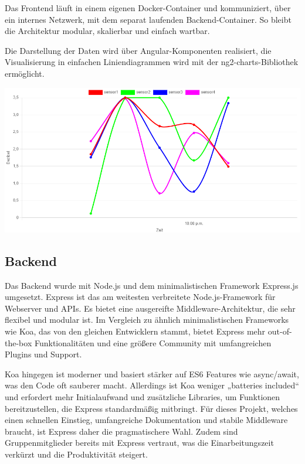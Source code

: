 Das Frontend läuft in einem eigenen Docker-Container und kommuniziert, 
über ein internes Netzwerk, mit dem separat laufenden Backend-Container. 
So bleibt die Architektur modular, skalierbar und einfach wartbar.

Die Darstellung der Daten wird über Angular-Komponenten realisiert,
die Visualisierung in einfachen Liniendiagrammen wird mit der ng2-charts-Bibliothek ermöglicht.
\begin{center}
  \includegraphics[width=1\textwidth]{../images/LinechartFE.png}
\end{center}

\subsection{Backend}
Das Backend wurde mit Node.js und dem minimalistischen Framework Express.js umgesetzt. 
Express ist das am weitesten verbreitete Node.js-Framework für Webserver und APIs. 
Es bietet eine ausgereifte Middleware-Architektur, die sehr flexibel und modular ist. 
Im Vergleich zu ähnlich minimalistischen Frameworks wie Koa, 
das von den gleichen Entwicklern stammt, 
bietet Express mehr out-of-the-box Funktionalitäten und eine größere Community mit umfangreichen Plugins und Support. \cite{betterstack2025koavsexpress,appventurez2025nodejsframework}

Koa hingegen ist moderner und basiert stärker auf ES6 Features wie async/await, was den Code oft sauberer macht. 
Allerdings ist Koa weniger „batteries included“ und erfordert mehr Initialaufwand und zusätzliche Libraries, 
um Funktionen bereitzustellen, die Express standardmäßig mitbringt. 
Für dieses Projekt, welches einen schnellen Einstieg, umfangreiche Dokumentation und stabile Middleware braucht, 
ist Express daher die pragmatischere Wahl.
Zudem sind Gruppenmitglieder bereits mit Express vertraut, was die Einarbeitungszeit verkürzt und die Produktivität steigert. 




